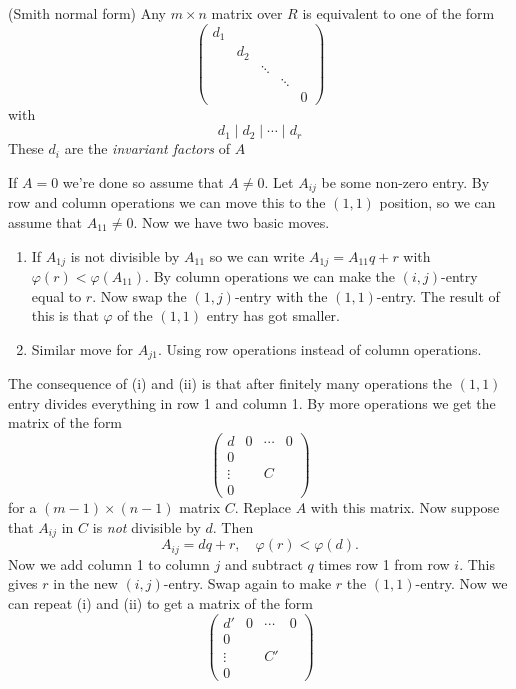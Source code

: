 \documentclass{article}
\begin{document}
\begin{theorem}
	(Smith normal form) Any $ m\times n $ matrix over $ R $ is equivalent to one of the form
	\[
	  \begin{pmatrix}
		  d_1 & & & & \\
		  & d_2 & & & \\
		  & & \ddots & & \\
		  & & & \ddots & \\
		  & & & & 0 
	  \end{pmatrix}
	\]
	with
	\[
	  d_1\mid d_2\mid \cdots \mid d_r
	\]
	These $ d_i $ are the \textit{invariant factors} of $ A $
\end{theorem}
\pf If $ A=0 $ we're done so assume that $ A\ne 0  $. Let $ A_{ij} $ be some non-zero entry. By row and column operations we can move this to the $ (1,1) $ position, so we can assume that $ A_{11}\ne 0 $. Now we have two basic moves.
\begin{enumerate}
\item If $ A_{1j} $ is not divisible by $ A_{11} $ so we can write $ A_{1j}=A_{11}q+r $ with $ \varphi(r)<\varphi(A_{11}) $. By column operations we can make the $ (i,j) $-entry equal to $ r $. Now swap the $ (1,j) $-entry with the $ (1,1) $-entry. The result of this is that $ \varphi $ of the $ (1,1) $ entry has got smaller.
\item Similar move for $ A_{j1} $. Using row operations instead of column operations.
\end{enumerate}
The consequence of (i) and (ii) is that after finitely many operations the $ (1,1) $ entry divides everything in row 1 and column 1. By more operations we get the matrix of the form
\[
  \begin{pmatrix}
	  d & 0 & \cdots & 0 \\
	  0 & & & \\
	  \vdots & & C & \\
	  0 & & &
  \end{pmatrix}
\]
for a $ (m-1)\times(n-1) $ matrix $ C $. Replace $ A $ with this matrix. Now suppose that $ A_{ij} $ in $ C $ is \textit{not} divisible by $ d $. Then
\[
	A_{ij} = dq + r,\quad \varphi(r)<\varphi(d).
\]
Now we add column 1 to column $ j $ and subtract $ q $ times row 1 from row $ i $. This gives $ r $ in the new $ (i,j) $-entry. Swap again to make $ r $ the $ (1,1) $-entry. Now we can repeat (i) and (ii) to get a matrix of the form
\[
  \begin{pmatrix}
	  d' & 0 & \cdots & 0 \\
	  0 & & & \\
	  \vdots & & C' & \\
	  0 & & & 
  \end{pmatrix}
\]
\end{document}
